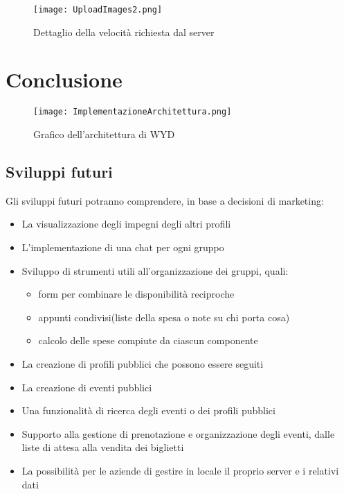 \begin{figure}[htbp]
    \begin{center}
        \texttt{[image: UploadImages2.png]}
        \caption{Dettaglio della velocità richiesta dal server}
    \end{center}
\end{figure}


\clearpage
\chapter*{Conclusione}

\begin{figure}[htbp]
    \begin{center}
        \texttt{[image: ImplementazioneArchitettura.png]}
        \caption{Grafico dell'architettura di WYD}
    \end{center}
\end{figure}
\clearpage

\section{Sviluppi futuri}
Gli sviluppi futuri potranno comprendere, in base a decisioni di marketing:
\begin{itemize}
    \item La visualizzazione degli impegni degli altri profili
    \item L'implementazione di una chat per ogni gruppo
    \item Sviluppo di strumenti utili all'organizzazione dei gruppi, quali:
          \begin{itemize}
              \item form per combinare le disponibilità reciproche
              \item appunti condivisi(liste della spesa o note su chi porta cosa)
              \item calcolo delle spese compiute da ciascun componente
          \end{itemize}
    \item La creazione di profili pubblici che possono essere seguiti
    \item La creazione di eventi pubblici
    \item Una funzionalità di ricerca degli eventi o dei profili pubblici
    \item Supporto alla gestione di prenotazione e organizzazione degli eventi, dalle liste di attesa alla vendita dei biglietti
    \item La possibilità per le aziende di gestire in locale il proprio server e i relativi dati
\end{itemize}
\clearpage

